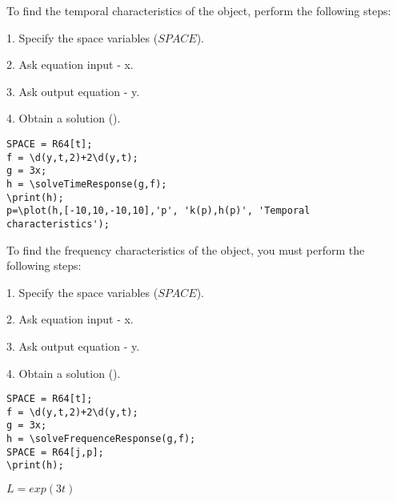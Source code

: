 To find the temporal characteristics of the object, perform the following steps:

1. Specify the space variables ($SPACE$). 

2. Ask equation input - x. 

3. Ask output equation - y. 

4. Obtain a solution ().

\begin{verbatim}
SPACE = R64[t]; 
f = \d(y,t,2)+2\d(y,t); 
g = 3x; 
h = \solveTimeResponse(g,f); 
\print(h);
p=\plot(h,[-10,10,-10,10],'p', 'k(p),h(p)', 'Temporal characteristics');
\end{verbatim}


To find the frequency characteristics of the object, you must perform the following steps:

1. Specify the space variables ($SPACE$). 

2. Ask equation input - x. 

3. Ask output equation - y. 

4. Obtain a solution ().

\begin{verbatim}
SPACE = R64[t]; 
f = \d(y,t,2)+2\d(y,t); 
g = 3x; 
h = \solveFrequenceResponse(g,f); 
SPACE = R64[j,p];
\print(h);
\end{verbatim}


{$L = exp(3t)$}
